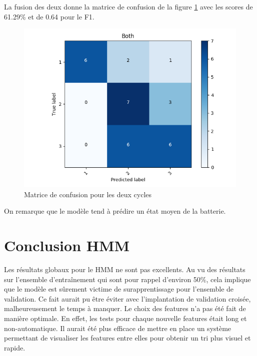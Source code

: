 La fusion des deux donne la matrice de confusion de la figure \ref{fig:HMMconfboth} avec les scores de 61.29\% et de 0.64 pour le F1.

\begin{figure}[H]
    \centering
    \includegraphics[scale=0.5]{images/Confboth.png}
    \caption{Matrice de confusion pour les deux cycles}
    \label{fig:HMMconfboth}
\end{figure}

On remarque que le modèle tend à prédire un état moyen de la batterie.

\section{Conclusion \ac{HMM}}
Les résultats globaux pour le \ac{HMM} ne sont pas excellents. Au vu des résultats sur l'ensemble d'entraînement qui sont pour rappel d'environ 50\%, cela implique que le modèle est sûrement victime de surapprentissage pour l'ensemble de validation.
Ce fait aurait pu être éviter avec l'implantation de validation croisée, malheureusement le temps à manquer.
Le choix des features n'a pas été fait de manière optimale. En effet, les tests pour chaque nouvelle features était long et non-automatique.
Il aurait été plus efficace de mettre en place un système permettant de visualiser les features entre elles pour obtenir un tri plus visuel et rapide.